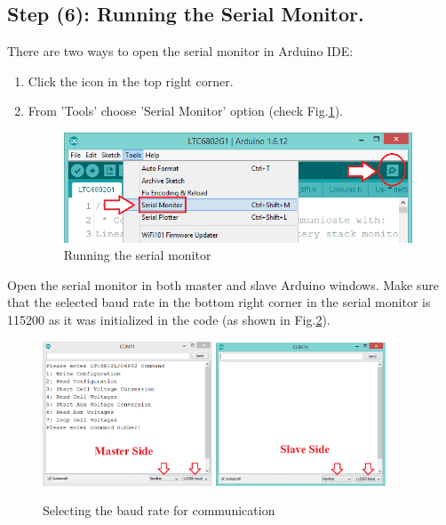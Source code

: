 \subsection{Step (6): Running the Serial Monitor.}
There are two ways to open the serial monitor in Arduino IDE:
\begin{enumerate}
\item Click the icon in the top right corner.
\item From 'Tools' choose 'Serial Monitor' option (check Fig.\ref{fig:erialMon}).
\begin{figure}[h]
    \centering
    \includegraphics[width=10.38cm,height=3.27cm]{figures/image14}
    \caption{Running the serial monitor}
    \label{fig:erialMon}
\end{figure}
\end{enumerate}

Open the serial monitor in both master and slave Arduino windows. Make sure that the selected baud rate in the bottom right corner in the serial monitor is 115200 as it was initialized in the code (as shown in Fig.\ref{fig:serialBaud}).
\begin{figure}[h]
\centering
\includegraphics[width=0.45\textwidth]{figures/image15}\;
\includegraphics[width=0.45\textwidth]{figures/image16}
\caption{Selecting the baud rate for communication}
    \label{fig:serialBaud}
\end{figure}

